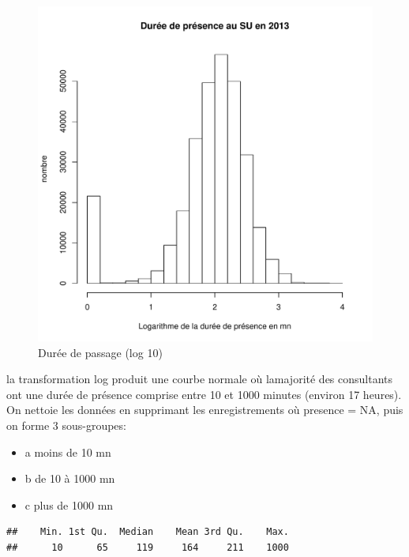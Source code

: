 \documentclass[12pt,english,french,twoside]{report}\usepackage[]{graphicx}\usepackage[]{color}
\makeatletter
\def\maxwidth{ %
  \ifdim\Gin@nat@width>\linewidth
    \linewidth
  \else
    \Gin@nat@width
  \fi
}
\newenvironment{kframe}{%
 \def\at@end@of@kframe{}%
 \ifinner\ifhmode%
  \def\at@end@of@kframe{\end{minipage}}%
  \begin{minipage}{\columnwidth}%
 \fi\fi%
 \def\FrameCommand##1{\hskip\@totalleftmargin \hskip-\fboxsep
 \colorbox{shadecolor}{##1}\hskip-\fboxsep
     \hskip-\linewidth \hskip-\@totalleftmargin \hskip\columnwidth}%
 \MakeFramed {\advance\hsize-\width
   \@totalleftmargin\z@ \linewidth\hsize
   \@setminipage}}%
 {\par\unskip\endMakeFramed%
 \at@end@of@kframe}
\newenvironment{knitrout}{}{} %
\makeatother
\begin{document}
\begin{figure}[ht!]
 \centering
\begin{knitrout}
\color{fgcolor}
\includegraphics[width=\maxwidth]{figure/log_passages} 

\end{knitrout}

 \caption{Durée de passage (log 10)}
\end{figure}

la transformation log produit une courbe normale où lamajorité des consultants ont une durée de présence comprise entre 10 et 1000 minutes (environ 17 heures). On nettoie les données en supprimant les enregistrements où presence = NA, puis on forme 3 sous-groupes:
\begin{itemize}
  \item a moins de 10 mn
  \item b de 10 à 1000 mn
  \item c plus de 1000 mn
\end{itemize}

\begin{knitrout}
\color{fgcolor}\begin{kframe}
\begin{verbatim}
##    Min. 1st Qu.  Median    Mean 3rd Qu.    Max. 
##      10      65     119     164     211    1000
\end{verbatim}
\end{kframe}
\end{knitrout}
\end{document}

